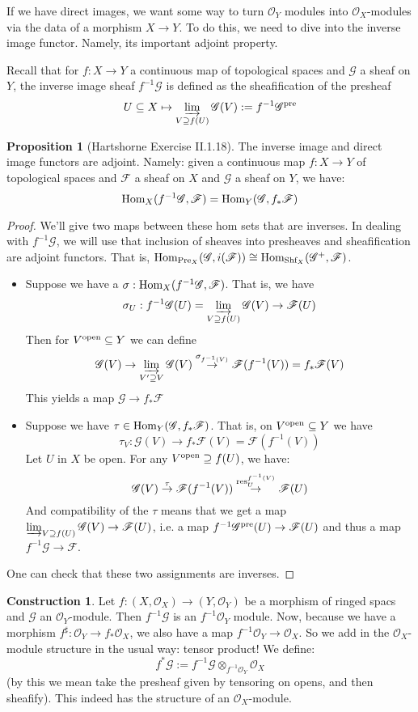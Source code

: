 \documentclass[10pt,reqno]{amsart}
\theoremstyle{definition}
\newtheorem{proposition}[theorem]{Proposition}
\newtheorem{construction}[theorem]{Construction}
\theoremstyle{remark}
\numberwithin{equation}{section}
\numberwithin{theorem}{section}
\newcommand{\OO}{{\mathcal O}}
\newcommand{\Hom}{\textup{Hom}}
\newcommand{\FF}{{\mathscr F}}
\newcommand{\GG}{{\mathscr G}}
\begin{document}
If we have direct images, we want some way to turn $\OO_Y$ modules into $\OO_X$-modules via the data of a morphism $X \to Y$. To do this, we need to dive into the inverse image functor. Namely, its important adjoint property.

Recall that for $f: X \to Y$ a continuous map of topological spaces and $\GG$ a sheaf on $Y$, the inverse image sheaf $f^{-1} \GG$ is defined as the sheafification of the presheaf
\[U \subseteq X \mapsto \varinjlim_{V \supseteq f(U)} \GG(V) := f^{-1}\GG^{\textup{pre}}\]

\begin{proposition}[Hartshorne Exercise II.1.18] The inverse image and direct image functors are adjoint. Namely: given a continuous map $f:X \to Y$ of topological spaces and $\FF$ a sheaf on $X$ and $\GG$ a sheaf on $Y$, we have:
\[\Hom_{X}(f^{-1}\GG, \FF) = \Hom_Y (\GG,f_* \FF)\]
\end{proposition}
\begin{proof}
We'll give two maps between these hom sets that are inverses. In dealing with $f^{-1} \GG$, we will use that inclusion of sheaves into presheaves and sheafification are adjoint functors. That is, $\Hom_{\textup{Pre}_X} (\GG, i(\FF)) \cong \Hom_{\textup{Shf}_X}(\GG^+, \FF)$.
\begin{itemize}
\item Suppose we have a $\sigma: \Hom_{X}(f^{-1}\GG,\FF)$. That is, we have 
\[\sigma_U: f^{-1}\GG(U) = \varinjlim_{V \supseteq f(U)} \GG(V) \to \FF(U)\]
Then for $V^{\textup{open}} \subseteq Y$ we can define
\[\GG(V) \to \varinjlim_{V' \supseteq V} \GG(V) \stackrel{\sigma_{f^{-1}(V)}}{\to} \FF(f^{-1}(V)) = f_* \FF(V)\]
This yields a map $\GG \to f_* \FF$
\item Suppose we have $\tau \in \Hom_Y(\GG, f_* \FF)$. That is, on $V^{\textup{open}} \subseteq Y$ we have 
\[\tau_V: \GG(V) \to f_*\FF(V) = \FF(f^{-1}(V))\]
Let $U$ in $X$ be open. For any $V^{\textup{open}} \supseteq f(U)$, we have:
\[\GG(V) \stackrel{\tau}{\to} \FF(f^{-1}(V)) \stackrel{\textup{res}^{f^{-1}(V)}_{U}}{\to} \FF(U)\]
And compatibility of the $\tau$ means that we get a map $\varinjlim_{V \supseteq f(U)} \GG(V) \to \FF(U)$, i.e. a map $f^{-1}\GG^{\textup{pre}} (U) \to \FF(U)$ and thus a map $f^{-1}\GG \to \FF$.
\end{itemize}
One can check that these two assignments are inverses. 
\end{proof}

\begin{construction} Let $f: (X,\OO_X) \to (Y,\OO_Y)$ be a morphism of ringed spacs and $\GG$ an $\OO_Y$-module.  Then $f^{-1}\GG$ is an $f^{-1}\OO_Y$ module. Now, because we have a morphism $f^{\sharp}: \OO_Y \to f_* \OO_X$, we also have a map $f^{-1}\OO_Y \to \OO_X$. So we add in the $\OO_X$-module structure in the usual way: tensor product! We define: 
\[f^* \GG := f^{-1}\GG \otimes_{f^{-1}\OO_Y} \OO_X\]
(by this we mean take the presheaf given by tensoring on opens, and then sheafify). This indeed has the structure of an $\OO_X$-module.
\end{construction}
\end{document}
